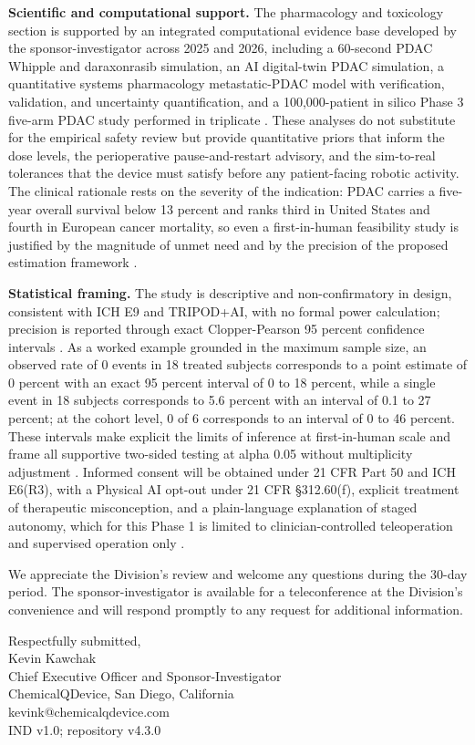 \noindent\textbf{Scientific and computational support.} The pharmacology and toxicology section is supported by an integrated computational evidence base developed by the sponsor-investigator across 2025 and 2026, including a 60-second PDAC Whipple and daraxonrasib simulation, an AI digital-twin PDAC simulation, a quantitative systems pharmacology metastatic-PDAC model with verification, validation, and uncertainty quantification, and a 100,000-patient in silico Phase 3 five-arm PDAC study performed in triplicate \cite{qspmetpancre,fdadigtwinpc,chatgpt100kp,pdacdigtwinp}. These analyses do not substitute for the empirical safety review but provide quantitative priors that inform the dose levels, the perioperative pause-and-restart advisory, and the sim-to-real tolerances that the device must satisfy before any patient-facing robotic activity. The clinical rationale rests on the severity of the indication: PDAC carries a five-year overall survival below 13 percent and ranks third in United States and fourth in European cancer mortality, so even a first-in-human feasibility study is justified by the magnitude of unmet need and by the precision of the proposed estimation framework \cite{pdac060s2030,paipredict4x}.

\noindent\textbf{Statistical framing.} The study is descriptive and non-confirmatory in design, consistent with ICH E9 and TRIPOD+AI, with no formal power calculation; precision is reported through exact Clopper-Pearson 95 percent confidence intervals \cite{ichpaistduni,llmcomp16fda}. As a worked example grounded in the maximum sample size, an observed rate of 0 events in 18 treated subjects corresponds to a point estimate of 0 percent with an exact 95 percent interval of 0 to 18 percent, while a single event in 18 subjects corresponds to 5.6 percent with an interval of 0.1 to 27 percent; at the cohort level, 0 of 6 corresponds to an interval of 0 to 46 percent. These intervals make explicit the limits of inference at first-in-human scale and frame all supportive two-sided testing at alpha 0.05 without multiplicity adjustment \cite{ichpaistduni}. Informed consent will be obtained under 21 CFR Part 50 and ICH E6(R3), with a Physical AI opt-out under 21 CFR \S 312.60(f), explicit treatment of therapeutic misconception, and a plain-language explanation of staged autonomy, which for this Phase 1 is limited to clinician-controlled teleoperation and supervised operation only \cite{cfr050paiuni}.

\noindent We appreciate the Division's review and welcome any questions during the 30-day period. The sponsor-investigator is available for a teleconference at the Division's convenience and will respond promptly to any request for additional information.

\noindent Respectfully submitted, \\[1.0em]
Kevin Kawchak \\
Chief Executive Officer and Sponsor-Investigator \\
ChemicalQDevice, San Diego, California \\
kevink@chemicalqdevice.com \\
IND v1.0; repository v4.3.0
